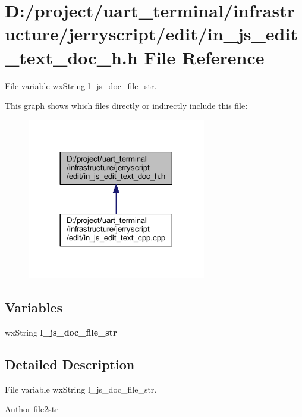 \section{D\+:/project/uart\+\_\+terminal/infrastructure/jerryscript/edit/in\+\_\+js\+\_\+edit\+\_\+text\+\_\+doc\+\_\+h.h File Reference}
\label{in__js__edit__text__doc__h_8h}


File variable wx\+String l\+\_\+js\+\_\+doc\+\_\+file\+\_\+str.  


This graph shows which files directly or indirectly include this file\+:
\nopagebreak
\begin{figure}[H]
\begin{center}
\leavevmode
\includegraphics[width=221pt]{in__js__edit__text__doc__h_8h__dep__incl}
\end{center}
\end{figure}
\subsection*{Variables}
\begin{DoxyCompactItemize}
\item 
wx\+String \textbf{ l\+\_\+js\+\_\+doc\+\_\+file\+\_\+str}
\end{DoxyCompactItemize}


\subsection{Detailed Description}
File variable wx\+String l\+\_\+js\+\_\+doc\+\_\+file\+\_\+str. 

\begin{DoxyAuthor}{Author}
file2str 
\end{DoxyAuthor}



